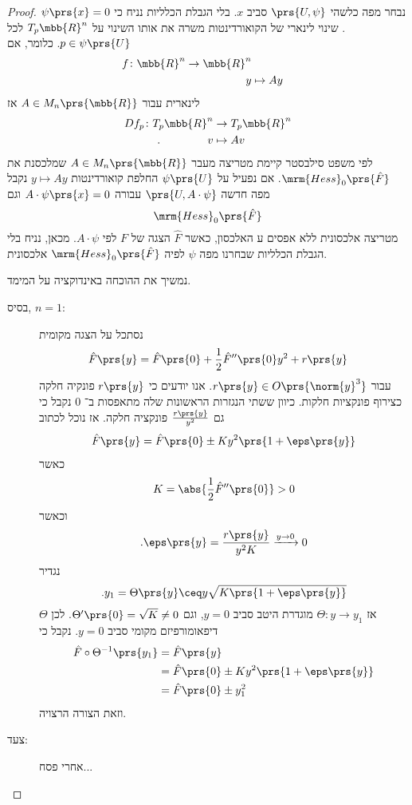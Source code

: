 \documentclass[a4paper,10pt,twoside,openany]{book}
\begin{document}
\begin{proof}
נבחר מפה כלשהי
$\prs{U,\psi}$
סביב
$x$.
בלי הגבלת הכלליות נניח כי
$\psi\prs{x} = 0$.
שינוי לינארי של הקואורדינטות משרה את אותו השינוי על
$T_p \mbb{R}^n$
לכל
$p \in \psi\prs{U}$.
כלומר, אם
\begin{align*}
f \colon \mbb{R}^n \to \mbb{R}^n \\
y &\mapsto A y
\end{align*}
לינארית עבור
$A \in M_n\prs{\mbb{R}}$
אז
\begin{align*}
D f_p \colon T_p \mbb{R}^n &\to T_p \mbb{R}^n \\
\text{.} \hphantom{lalalalala} v &\mapsto A v
\end{align*}
לפי משפט סילבסטר קיימת מטריצה מעבר
$A \in M_n\prs{\mbb{R}}$
שמלכסנת את
$\mrm{Hess}_0\prs{\hat{F}}$.
אם נפעיל על
$\psi\prs{U}$
החלפת קואורדינטות
$y \mapsto Ay$
נקבל מפה חדשה
$\prs{U, A \cdot \psi}$
עבורה
$A \cdot \psi\prs{x} = 0$
וגם
\[\mrm{Hess}_0\prs{\hat{F}}\]
מטריצה אלכסונית ללא אפסים ע האלכסון, כאשר
$\hat{F}$
הצגה של
$F$
לפי
$A \cdot \psi$.
מכאן, נניח בלי הגבלת הכלליות שבחרנו מפה
$\psi$
לפיה
$\mrm{Hess}_0\prs{\hat{F}}$
אלכסונית.

נמשיך את ההוכחה באינדוקציה על המימד.

\begin{description}
\item[בסיס, $n = 1$:]
נסתכל על הצגה מקומית
\begin{align*}
\hat{F}\prs{y} &= \hat{F}\prs{0} + \frac{1}{2} \hat{F}''\prs{0} y^2 + r\prs{y}
\end{align*}
עבור
$r\prs{y} \in O\prs{\norm{y}^3}$.
אנו יודעים כי
$r\prs{y}$
פונקיה חלקה כצירוף פונקציות חלקות.
כיוון ששתי הנגזרות הראשונות שלה מתאפסות ב־%
$0$
נקבל כי גם
$\frac{r\prs{y}}{y^2}$
פונקציה חלקה.
אז נוכל לכתוב
\begin{align*}
\hat{F}\prs{y} = \hat{F}\prs{0} \pm K y^2 \prs{1 + \eps\prs{y}}
\end{align*}
כאשר
\[K = \abs{\frac{1}{2} \hat{F}''\prs{0}} > 0\]
וכאשר
\[\text{.} \eps\prs{y} = \frac{r\prs{y}}{y^2 K} \xrightarrow{y\to 0} 0\]
נגדיר
\[\text{.} y_1 = \Theta\prs{y} \ceq y \sqrt{K\prs{1+\eps\prs{y}}}\]
אז
$\Theta \colon y \to y_1$
מוגדרת היטב סביב
$y = 0$,
וגם
$\Theta'\prs{0} = \sqrt{K} \neq 0$.
לכן
$\Theta$
דיפאומורפיזם מקומי סביב
$y = 0$.
נקבל כי
\begin{align*}
\hat{F} \circ \Theta^{-1}\prs{y_1} &= \hat{F}\prs{y}
\\&=
\hat{F}\prs{0} \pm K y^2 \prs{1 + \eps\prs{y}}
\\&=
\hat{F}\prs{0} \pm y_1^2
\end{align*}
וזאת הצורה הרצויה.

\item[צעד:]
אחרי פסח...
\end{description}
\end{proof}


\backmatter
\end{document}
